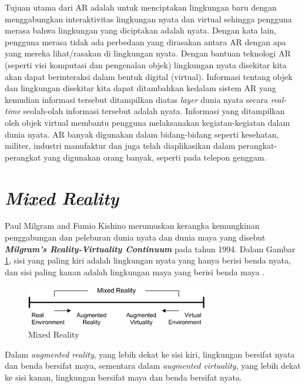 Tujuan utama dari AR adalah untuk menciptakan lingkungan baru dengan menggabungkan interaktivitas lingkungan nyata dan virtual sehingga pengguna merasa bahwa lingkungan yang diciptakan adalah nyata. Dengan kata lain, pengguna merasa tidak ada perbedaan yang dirasakan antara AR dengan apa yang mereka lihat/rasakan di lingkungan nyata. Dengan bantuan teknologi AR (seperti visi komputasi dan pengenalan objek) lingkungan nyata disekitar kita akan dapat berinteraksi dalam bentuk digital (virtual). Informasi tentang objek dan lingkungan disekitar kita dapat ditambahkan kedalam sistem AR yang kemudian informasi tersebut ditampilkan diatas \textit{layer} dunia nyata secara \textit{real-time} seolah-olah informasi tersebut adalah nyata. Informasi yang ditampilkan oleh objek virtual membantu pengguna melaksanakan kegiatan-kegiatan dalam dunia nyata. AR banyak digunakan dalam bidang-bidang seperti kesehatan, militer, industri manufaktur dan juga telah diaplikasikan dalam perangkat-perangkat yang digunakan orang banyak, seperti pada telepon genggam. 

\section{\textit{Mixed Reality}}
\label{sec:mixed_reality}
Paul Milgram and Fumio Kishino merumuskan  kerangka kemungkinan penggabungan dan peleburan dunia nyata dan dunia maya yang disebut \textit{\textbf{Milgram's Reality-Virtuality Continuum}} pada tahun  1994.  Dalam Gambar \ref{fig:milgram_continuum}, sisi yang paling kiri adalah lingkungan nyata yang hanya berisi benda nyata, dan sisi paling kanan adalah lingkungan maya yang berisi benda maya \cite{Milgram1994a}.  

\begin{figure}[h]
\begin{center}
\includegraphics{./images/Milgram_Continuum}
\caption{\label{fig:milgram_continuum} Mixed Reality}
\end{center}
\end{figure}

Dalam \textit{augmented reality}, yang lebih dekat ke sisi kiri, lingkungan bersifat nyata dan benda bersifat maya, sementara dalam \textit{augmented virtuality}, yang lebih dekat ke sisi kanan, lingkungan bersifat maya dan benda bersifat nyata. 

